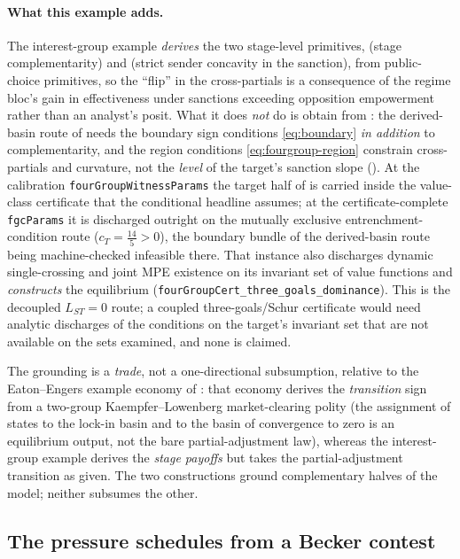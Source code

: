 \paragraph{What this example adds.}
The interest-group example \emph{derives} the two stage-level primitives,
 (stage complementarity) and  (strict
sender concavity in the sanction), from public-choice primitives, so the
``flip'' in the cross-partials is a consequence of the regime bloc's gain in effectiveness under
sanctions exceeding opposition empowerment rather than an analyst's posit. What it does
\emph{not} do is obtain  from : the
derived-basin route of  needs the boundary sign conditions
\eqref{eq:boundary} \emph{in addition} to complementarity, and the region
conditions \eqref{eq:fourgroup-region} constrain cross-partials and
curvature, not the \emph{level} of the target's sanction slope
(). At the calibration
\texttt{fourGroupWitnessParams} the target half of  is
carried inside the value-class certificate that the conditional headline
assumes; at the certificate-complete \texttt{fgcParams} it is discharged
outright on the mutually exclusive entrenchment-condition route ($c_T=\tfrac{14}{5}>0$),
the boundary bundle of the derived-basin route being machine-checked infeasible there. That
instance also discharges dynamic single-crossing and joint MPE existence on
its invariant set of value functions and \emph{constructs} the equilibrium
(\texttt{fourGroupCert\_three\_goals\_dominance}). This is the decoupled
$L_{ST}=0$ route; a coupled three-goals/Schur certificate would need
analytic discharges of the conditions on the target's invariant set that are not available
on the sets examined, and none is claimed.

The grounding is a \emph{trade}, not a one-directional subsumption,
relative to the Eaton--Engers example economy of :
that economy derives the \emph{transition} sign from a two-group
Kaempfer--Lowenberg market-clearing polity (the assignment of states to the lock-in
basin and to the basin of convergence to zero is an equilibrium output, not the bare partial-adjustment law),
whereas the interest-group example derives the \emph{stage payoffs} but
takes the partial-adjustment transition as given. The two constructions ground
complementary halves of the model; neither subsumes the other.

\subsection{The pressure schedules from a Becker contest}
\label{sec:fourgroup:contest}


